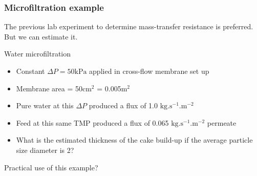 \begin{frame}\frametitle{Microfiltration example}
	The previous lab experiment to determine mass-transfer resistance is preferred. But we can estimate it. 
	\vspace{12pt}
	\begin{exampleblock}{Water microfiltration}
		\begin{itemize}
			\item	Constant $\Delta P = 50\text{kPa}$ applied in cross-flow membrane set up
			\item	Membrane area = 50cm$^2$ = 0.005m$^2$
			\item	Pure water at this $\Delta P$ produced a flux of 1.0 $\text{kg}.\text{s}^{-1}\text{.m}^{-2}$
			\item	Feed at this same TMP produced a flux of 0.065 $\text{kg}.\text{s}^{-1}\text{.m}^{-2}$ permeate
			\item	What is the estimated thickness of the cake build-up if the average particle size diameter is 2\micron?
		\end{itemize}
	\end{exampleblock}
	\vfill
	Practical use of this example?
\end{frame}



